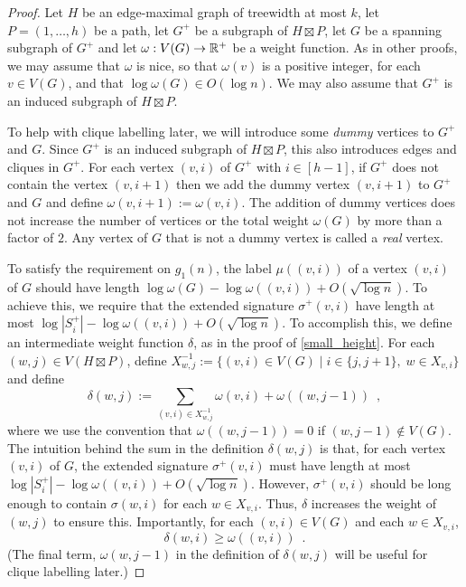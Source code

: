 \documentclass{patmorin}
\renewcommand{\ge}{\geqslant}
\newcommand{\defin}[1]{\emph{\textcolor{brightmaroon}{#1}}}
\newcommand{\Oh}{O}
\begin{document}
\begin{proof}
    Let $H$ be an edge-maximal graph of treewidth at most $k$, let $P=(1,\ldots,h)$ be a path, let $G^+$ be a subgraph of $H\boxtimes P$, let $G$ be a spanning subgraph of $G^+$ and let $\omega:V(G)\to\mathbb{R}^+$ be a weight function.  As in other proofs, we may assume that $\omega$ is nice, so that $\omega(v)$ is a positive integer, for each $v\in V(G)$, and that $\log\omega(G)\in\Oh(\log n)$.  We may also assume that $G^+$ is an induced subgraph of $H\boxtimes P$.

    To help with clique labelling later, we will introduce some \defin{dummy} vertices to $G^+$ and $G$.  Since $G^+$ is an induced subgraph of $H\boxtimes P$, this also introduces edges and cliques in $G^+$.  For each vertex $(v,i)$ of $G^+$ with $i\in[h-1]$, if $G^+$ does not contain the vertex $(v,i+1)$ then we add the dummy vertex $(v,i+1)$ to $G^+$ and $G$ and define $\omega(v,i+1):=\omega(v,i)$.  The addition of dummy vertices does not increase the number of vertices or the total weight $\omega(G)$ by more than a factor of $2$.  Any vertex of $G$ that is not a dummy vertex is called a \defin{real} vertex.

    To satisfy the requirement on $g_1(n)$, the label $\mu((v,i))$ of a vertex $(v,i)$ of $G$ should have length $\log \omega(G)-\log\omega((v,i)) + \Oh(\sqrt{\log n})$.  To achieve this, we require that the extended signature $\sigma^+(v,i)$ have length at most $\log|S_i^+|-\log\omega((v,i)) + \Oh(\sqrt{\log n})$.  To accomplish this, we define an intermediate weight function $\delta$, as in the proof of \cref{small_height}.  For each $(w,j)\in V(H\boxtimes P)$, define $X^{-1}_{w,j}:=\{(v,i)\in V(G)\mid i\in\{j,j+1\},\; w\in X_{v,i}\}$ and define
    \[
      \delta(w,j):=\sum_{(v,i)\in X^{-1}_{w,j}}\omega(v,i) + \omega((w,j-1)) \enspace ,
    \]
    where we use the convention that $\omega((w,j-1))=0$ if $(w,j-1)\not\in V(G)$.
    The intuition behind the sum in the definition $\delta(w,j)$ is that, for each vertex $(v,i)$ of $G$, the extended signature $\sigma^+(v,i)$ must have length at most $\log|S^+_i|-\log\omega((v,i))+\Oh(\sqrt{\log n})$.  However, $\sigma^+(v,i)$ should be long enough to contain $\sigma(w,i)$ for each $w\in X_{v,i}$.  Thus, $\delta$ increases the weight of $(w,j)$ to ensure this.
    Importantly, for each $(v,i)\in V(G)$ and each $w\in X_{v,i}$,
    \begin{equation}
      \delta(w,i) \ge \omega((v,i)) \enspace . \label{delta_v_omega}
    \end{equation}
    (The final term, $\omega(w,j-1)$ in the definition of $\delta(w,j)$ will be useful for clique labelling later.)


\end{proof}
\end{document}
